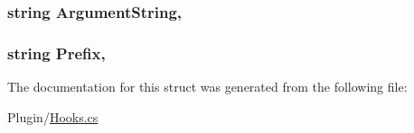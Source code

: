 \subsubsection[{Argument\+String}]{\setlength{\rightskip}{0pt plus 5cm}string Argument\+String\hspace{0.3cm}{\ttfamily [get]}, {\ttfamily [set]}}\label{structOTA_1_1Plugin_1_1HookArgs_1_1Command_a26c3571b3256a575cb30f8435920b6ba}
\hypertarget{structOTA_1_1Plugin_1_1HookArgs_1_1Command_a0bf9d0add9f4a8c150513d661361598c}{}
\subsubsection[{Prefix}]{\setlength{\rightskip}{0pt plus 5cm}string Prefix\hspace{0.3cm}{\ttfamily [get]}, {\ttfamily [set]}}\label{structOTA_1_1Plugin_1_1HookArgs_1_1Command_a0bf9d0add9f4a8c150513d661361598c}


The documentation for this struct was generated from the following file\+:\begin{DoxyCompactItemize}
\item 
Plugin/\hyperlink{Hooks_8cs}{Hooks.\+cs}\end{DoxyCompactItemize}
